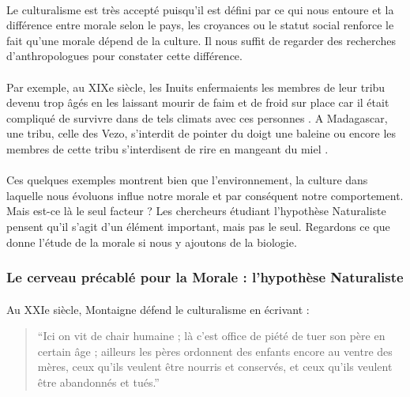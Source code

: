 \documentclass[10pt, french, a4paper]{report}
\begin{document}
\paragraph{}
Le culturalisme est très accepté puisqu'il est défini par ce qui nous entoure et la différence entre morale selon le pays, les croyances ou le statut social renforce le fait qu'une morale dépend de la culture. Il nous suffit de regarder des recherches d'anthropologues pour constater cette différence.

\paragraph{}
Par exemple, au XIXe siècle, les Inuits enfermaients les membres de leur tribu devenu trop âgés en les laissant mourir de faim et de froid sur place car il était compliqué de survivre dans de tels climats avec ces personnes \citep{redfield_primitive_1965}. A Madagascar, une tribu, celle des Vezo, s'interdit de pointer du doigt une baleine ou encore les membres de cette tribu s'interdisent de rire en mangeant du miel \citep{astuti_moralite_2007}.

\paragraph{}
Ces quelques exemples montrent bien que l'environnement, la culture dans laquelle nous évoluons influe notre morale et par conséquent notre comportement. Mais est-ce là le seul facteur ? Les chercheurs étudiant l'hypothèse Naturaliste pensent qu'il s'agit d'un élément important, mais pas le seul. Regardons ce que donne l'étude de la morale si nous y ajoutons de la biologie.


\subsubsection{Le cerveau précablé pour la Morale : l'hypothèse Naturaliste}

\paragraph{}
Au XXIe siècle, Montaigne défend le culturalisme en écrivant : 

\begin{quotation}
  ``Ici on vit de chair humaine ; là c'est office de piété de tuer son père en certain âge ; ailleurs les pères ordonnent des enfants encore au ventre des mères, ceux qu'ils veulent être nourris et conservés, et ceux qu'ils veulent être abandonnés et tués.''
\end{quotation} 
\end{document}
